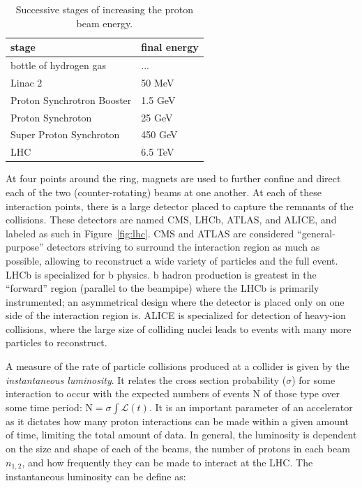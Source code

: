 \begin{table}
\centering
\caption{Successive stages of increasing the proton beam energy.}
\label{tab:stages}
\begin{tabular}{ll}
\hline\hline
stage & final energy\\
\hline
bottle of hydrogen gas & ...\\
Linac 2 & 50 MeV\\
Proton Synchrotron Booster & 1.5 GeV\\
Proton Synchroton & 25 GeV\\
Super Proton Synchroton & 450 GeV\\
LHC & 6.5 TeV\\
\hline
\hline
\end{tabular}
\end{table}

At four points around the ring, magnets are used to further confine and direct each of the two (counter-rotating) beams at one another. At each of these interaction points, there is a large detector placed to capture the remnants of the collisions. These detectors are named CMS, LHCb, ATLAS, and ALICE, and labeled as such in Figure~\ref{fig:lhc}. CMS and ATLAS are considered ``general-purpose'' detectors striving to surround the interaction region as much as possible, allowing to reconstruct a wide variety of particles and the full event. LHCb is specialized for b physics. b hadron production is greatest in the ``forward'' region (parallel to the beampipe) where the LHCb is primarily instrumented; an asymmetrical design where the detector is placed only on one side of the interaction region is. ALICE is specialized for detection of heavy-ion collisions, where the large size of colliding nuclei leads to events with many more particles to reconstruct.

A measure of the rate of particle collisions produced at a collider is given by the \textit{instantaneous luminosity}. It relates the cross section probability ($\sigma$) for some interaction to occur with the expected numbers of events N of those type over some time period: $\textrm{N} = \sigma \int \mathcal{L}(t)$. It is an important parameter of an accelerator as it dictates how many proton interactions can be made within a given amount of time, limiting the total amount of data. In general, the luminosity is dependent on the size and shape of each of the beams, the number of protons in each beam $n_{1,2}$, and how frequently they can be made to interact at the LHC. The instantaneous luminosity can be define as:

